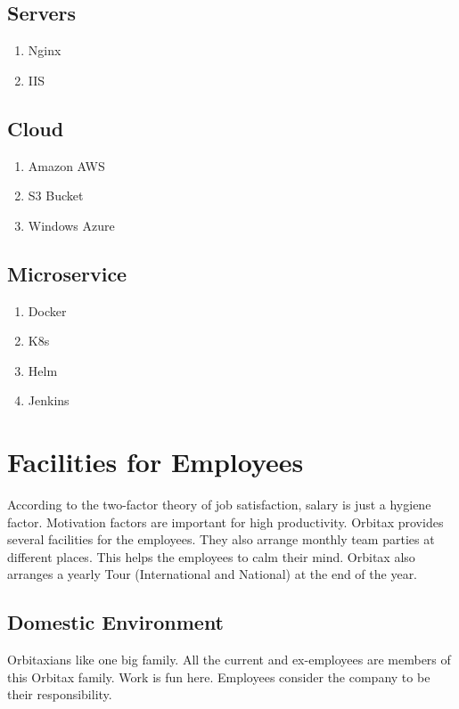 \begin{flushleft}
\subsection{Servers}
\begin{enumerate}
    \item Nginx
    \item IIS
\end{enumerate}



\subsection{Cloud}

\begin{enumerate}
    \item Amazon AWS
    \item S3 Bucket
    \item Windows Azure
\end{enumerate}


\subsection{Microservice}


\begin{enumerate}
    \item Docker
    \item K8s
    \item Helm
    \item Jenkins
\end{enumerate}





\section{Facilities for Employees}
According to the two-factor theory of job satisfaction, salary is just a hygiene factor. Motivation factors are important for high productivity. Orbitax provides several facilities for the employees.
They also arrange monthly team parties at different places. This helps the employees to calm their mind. 
Orbitax also arranges a yearly Tour (International and National) at the end of the year.

\subsection{Domestic Environment}
Orbitaxians like one big family. All the current and ex-employees are members of this Orbitax family. Work is fun here. Employees consider the company to be their responsibility.




\end{flushleft}
